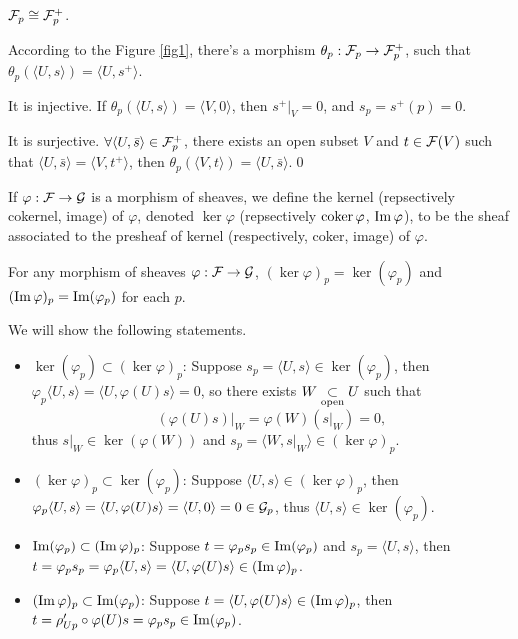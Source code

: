 \documentclass[12pt]{extbook}
\begin{document}
\pro \label{pro:4} $\mathcal{F}_p\cong \mathcal{F}^+_p$.

\proof According to the Figure \ref{fig1}, there's a morphism $\theta_p:\mathcal{F}_p\to \mathcal{F}^+_p$, such that $\theta_p(\langle U,s\rangle)=\langle U,s^+\rangle$.

It is injective. If $\theta_p(\langle U,s\rangle)=\langle V,0\rangle$, then $s^+|_V=0$, and $s_p=s^+(p)=0$.

It is surjective. $\forall \langle U,\bar{s}\rangle\in \mathcal{F}^+_p$, there exists an open subset $V$ and $t\in \mathcal{F}(V)$ such that $\langle U,\bar{s}\rangle=\langle V,t^+\rangle$, then $\theta_p(\langle V,t\rangle)=\langle U,\bar{s}\rangle$.\qed

\para If $\varphi:\mathcal{F}\to\mathcal{G}$ is a morphism of sheaves, we define the kernel (repsectively cokernel, image) of $\varphi$, denoted $\ker \varphi$ (repsectively $\operatorname{coker} \varphi$, $\operatorname{Im} \varphi$), to be the sheaf associated to the presheaf of kernel (respectively, coker, image) of $\varphi$.

\pro  \label{pro:5} For any morphism of sheaves $\varphi:\mathcal{F}\to\mathcal{G}$, $(\ker \varphi)_p=\ker(\varphi_p)$ and $(\operatorname{Im} \varphi)_p=\operatorname{Im}(\varphi_p)$ for each $p$.

\proof We will show the following statements.
	\begin{itemize}
		\item $\ker(\varphi_p)\subset (\ker \varphi)_p$: Suppose $s_p=\langle U,s\rangle\in \ker(\varphi_p)$, then $\varphi_p\langle U,s\rangle=\langle U,\varphi(U)s\rangle=0$, so there exists $W\underset{\mathrm{open}}{\subset} U$ such that 
		\[
			(\varphi(U)s)|_W=\varphi(W)(s|_W)=0,
		\]
		thus $s|_W\in \ker(\varphi(W))$ and $s_p=\langle W,s|_W\rangle\in (\ker \varphi)_p$.

		\item $(\ker \varphi)_p\subset\ker(\varphi_p)$: Suppose $\langle U,s\rangle\in (\ker \varphi)_p$, then $\varphi_p\langle U,s\rangle=\langle U,\varphi(U)s\rangle=\langle U,0\rangle=0\in \mathcal{G}_p$, thus $\langle U,s\rangle\in \ker(\varphi_p)$.

		\item $\operatorname{Im}(\varphi_p)\subset (\operatorname{Im} \varphi)_p$: Suppose $t=\varphi_ps_p\in\operatorname{Im} (\varphi_p)$ and $s_p=\langle U,s\rangle$, then $t=\varphi_ps_p=\varphi_p\langle U,s\rangle=\langle U,\varphi(U)s\rangle\in (\operatorname{Im} \varphi)_p$.

		\item $(\operatorname{Im} \varphi)_p\subset \operatorname{Im}(\varphi_p)$: Suppose $t=\langle U,\varphi(U)s\rangle\in (\operatorname{Im} \varphi)_p$, then $t=\rho'_{Up}\circ\varphi(U)s=\varphi_p s_p \in \operatorname{Im}(\varphi_p)$.
	\end{itemize}
\end{document}
